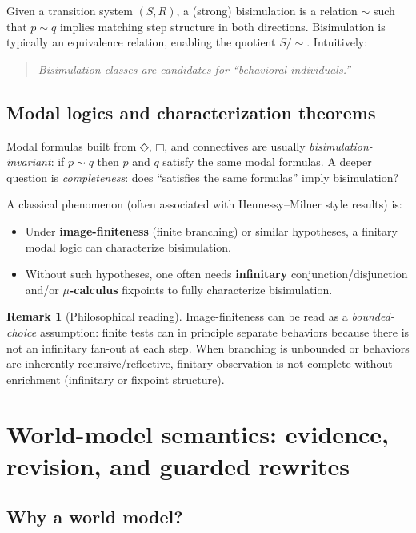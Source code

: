 \documentclass[11pt]{article}
\newcommand{\DiamondOp}{\mathbin{\Diamond}}
\newcommand{\BoxOp}{\mathbin{\Box}}
\theoremstyle{definition}
\newtheorem{remark}{Remark}
\begin{document}
Given a transition system $(S,R)$, a (strong) bisimulation is a relation $\sim$ such that
$p \sim q$ implies matching step structure in both directions.
Bisimulation is typically an equivalence relation, enabling the quotient $S/{\sim}$.
Intuitively:
\begin{quote}
\emph{Bisimulation classes are candidates for ``behavioral individuals.''}
\end{quote}

\subsection{Modal logics and characterization theorems}

Modal formulas built from $\DiamondOp$, $\BoxOp$, and connectives are usually \emph{bisimulation-invariant}:
if $p \sim q$ then $p$ and $q$ satisfy the same modal formulas.
A deeper question is \emph{completeness}:
does ``satisfies the same formulas'' imply bisimulation?

A classical phenomenon (often associated with Hennessy--Milner style results) is:
\begin{itemize}[leftmargin=1.5em]
\item Under \textbf{image-finiteness} (finite branching) or similar hypotheses,
a finitary modal logic can characterize bisimulation.
\item Without such hypotheses, one often needs \textbf{infinitary} conjunction/disjunction
and/or \textbf{$\mu$-calculus} fixpoints to fully characterize bisimulation.
\end{itemize}

\begin{remark}[Philosophical reading]
Image-finiteness can be read as a \emph{bounded-choice} assumption:
finite tests can in principle separate behaviors because there is not an infinitary fan-out at each step.
When branching is unbounded or behaviors are inherently recursive/reflective,
finitary observation is not complete without enrichment (infinitary or fixpoint structure).
\end{remark}

\section{World-model semantics: evidence, revision, and guarded rewrites}

\subsection{Why a world model?}
\end{document}
